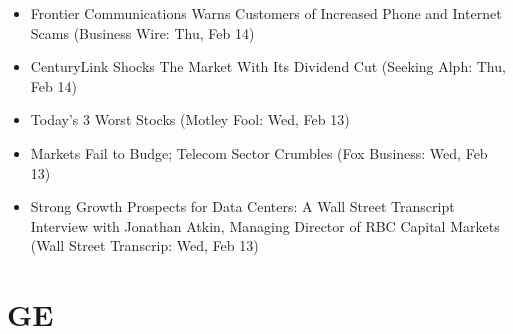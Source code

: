 \documentclass[11pt,asymmetric]{article}
\begin{document}
\begin{itemize}
\item Frontier Communications Warns Customers of Increased Phone and Internet Scams (Business Wire: Thu, Feb 14)
\item CenturyLink Shocks The Market With Its Dividend Cut (Seeking Alph: Thu, Feb 14)
\item Today's 3 Worst Stocks (Motley Fool: Wed, Feb 13)
\item Markets Fail to Budge; Telecom Sector Crumbles (Fox Business: Wed, Feb 13)
\item Strong Growth Prospects for Data Centers: A Wall Street Transcript Interview with Jonathan Atkin, Managing Director of RBC Capital Markets (Wall Street Transcrip: Wed, Feb 13)
\end{itemize}

\section*{GE}
\end{document}
